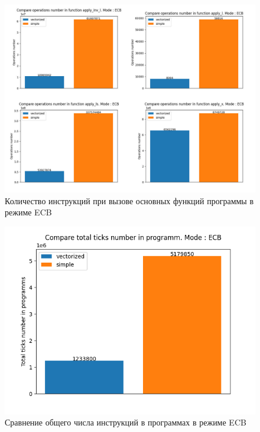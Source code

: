 \documentclass[a4paper, 12pt]{article}
\begin{document}
    \begin{figure}[h!]
        \centering
        \includegraphics[scale=0.31]{images/functions_instructions_calls_ECB.jpg}
        \caption{Количество инструкций при вызове основных функций программы в режиме ECB}
        \label{fig:functions_instructions_calls_ECB}
    \end{figure}

    \begin{figure}[h!]
        \centering
        \includegraphics{images/total_ticks_ECB.png}
        \caption{Сравнение общего числа инструкций в программах в режиме ECB}
        \label{fig:total_ticks_ECB}
    \end{figure}
\end{document}
